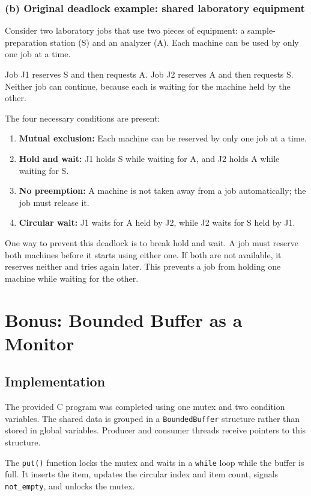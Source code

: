 \documentclass[conference]{IEEEtran}
\begin{document}
\subsubsection{(b) Original deadlock example: shared laboratory equipment}
Consider two laboratory jobs that use two pieces of equipment: a sample-preparation station (S) and an analyzer (A). Each machine can be used by only one job at a time.

Job J1 reserves S and then requests A. Job J2 reserves A and then requests S. Neither job can continue, because each is waiting for the machine held by the other.

The four necessary conditions are present:
\begin{enumerate}
    \item \textbf{Mutual exclusion:} Each machine can be reserved by only one job at a time.
    \item \textbf{Hold and wait:} J1 holds S while waiting for A, and J2 holds A while waiting for S.
    \item \textbf{No preemption:} A machine is not taken away from a job automatically; the job must release it.
    \item \textbf{Circular wait:} J1 waits for A held by J2, while J2 waits for S held by J1.
\end{enumerate}

One way to prevent this deadlock is to break hold and wait. A job must reserve both machines before it starts using either one. If both are not available, it reserves neither and tries again later. This prevents a job from holding one machine while waiting for the other.

\section{Bonus: Bounded Buffer as a Monitor}

\subsection{Implementation}
The provided C program was completed using one mutex and two condition variables. The shared data is grouped in a \texttt{BoundedBuffer} structure rather than stored in global variables. Producer and consumer threads receive pointers to this structure.

The \texttt{put()} function locks the mutex and waits in a \texttt{while} loop while the buffer is full. It inserts the item, updates the circular index and item count, signals \texttt{not\_empty}, and unlocks the mutex.
\end{document}
